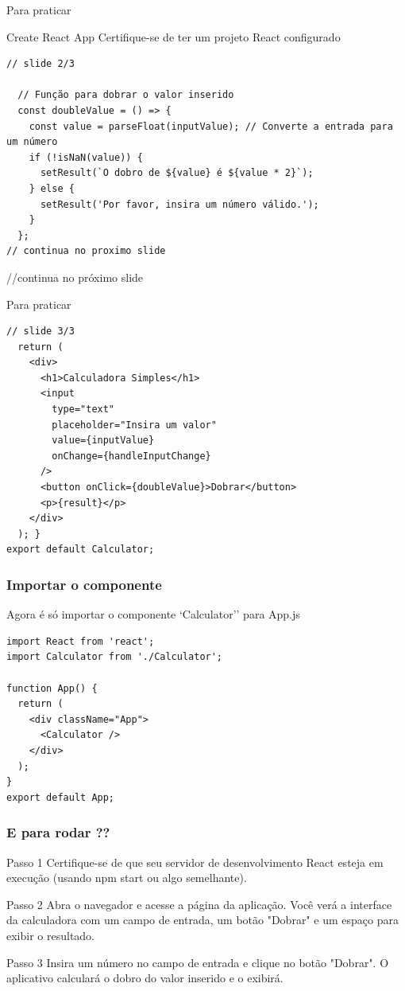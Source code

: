 \documentclass[13pt, xcolor={dvipsnames,svgnames}, portuguese]{beamer}
\begin{document}
\begin{frame}[fragile]{Para praticar}
\begin{exampleblock}{Create React App}
Certifique-se de ter um projeto React configurado
\end{exampleblock}
\begin{verbatim}
// slide 2/3

  // Função para dobrar o valor inserido
  const doubleValue = () => {
    const value = parseFloat(inputValue); // Converte a entrada para um número
    if (!isNaN(value)) {
      setResult(`O dobro de ${value} é ${value * 2}`);
    } else {
      setResult('Por favor, insira um número válido.');
    }
  };
// continua no proximo slide
\end{verbatim}
//continua no próximo slide
\end{frame}



\begin{frame}[fragile]{Para praticar}
\begin{verbatim}
// slide 3/3
  return (
    <div>
      <h1>Calculadora Simples</h1>
      <input
        type="text"
        placeholder="Insira um valor"
        value={inputValue}
        onChange={handleInputChange}
      />
      <button onClick={doubleValue}>Dobrar</button>
      <p>{result}</p>
    </div>
  ); }
export default Calculator;
\end{verbatim}
\end{frame}



\begin{frame}[fragile]
\frametitle{Importar o componente}
Agora é só importar o componente `Calculator'' para App.js

\begin{verbatim}
import React from 'react';
import Calculator from './Calculator';

function App() {
  return (
    <div className="App">
      <Calculator />
    </div>
  );
}
export default App;
\end{verbatim}

\end{frame}


\begin{frame}[fragile]
\frametitle{E para rodar ??}
\begin{block}{Passo 1}
Certifique-se de que seu servidor de desenvolvimento React esteja em execução (usando npm start ou algo semelhante).
\end{block}
\pause
\begin{block}{Passo 2}
Abra o navegador e acesse a página da aplicação. Você verá a interface da calculadora com um campo de entrada, um botão "Dobrar" e um espaço para exibir o resultado.
\end{block}
\pause
\begin{block}{Passo 3}
Insira um número no campo de entrada e clique no botão "Dobrar". O aplicativo calculará o dobro do valor inserido e o exibirá.
\end{block}
\end{frame}
\end{document}
